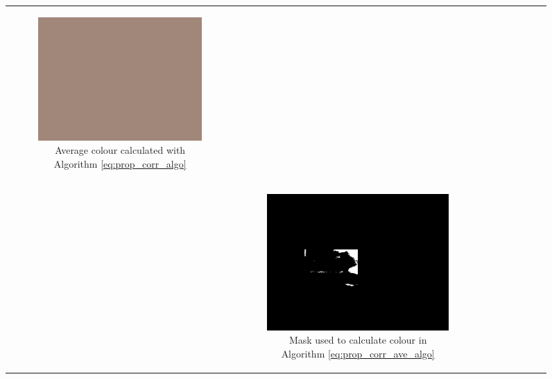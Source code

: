 \begin{figure}[H]
\begin{tabular}{ccc}
    \begin{subfigure}[b]{0.30\textwidth}
        \includegraphics[width=\textwidth]{images/ave_col_100}
        \caption{Average colour calculated with Algorithm \ref{eq:prop_corr_algo}}\label{img:ave_col_100}
    \end{subfigure}\\
    &
    \begin{subfigure}[b]{0.30\textwidth}
        \includegraphics[width=\textwidth]{images/pale_ave_10_adjusted_mask}
        \caption{Mask used to calculate colour in Algorithm \ref{eq:prop_corr_ave_algo}}\label{img:adjusted_mask}
    \end{subfigure} &
    \begin{subfigure}[b]{0.30\textwidth}

\end{subfigure}
\end{tabular}
\end{figure}

